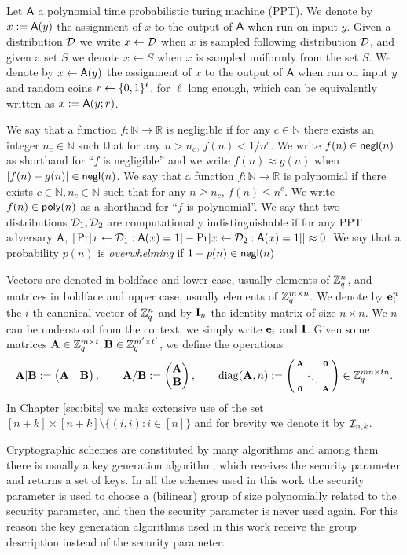 Let $\mathsf{A}$ a polynomial time probabilistic turing machine (PPT). We denote by $x:=\mathsf{A}(y)$ the assignment of $x$ to the output of $\mathsf{A}$ when run on input $y$. Given a distribution $\mathcal{D}$ we write $x\gets\mathcal{D}$ when $x$ is sampled following distribution $\mathcal{D}$, and given a set $S$ we denote $x\gets S$ when $x$ is sampled uniformly from the set $S$. We denote by $x\gets\mathsf{A}(y)$ the assignment of $x$ to the output of $\mathsf{A}$ when run on input $y$ and random coins $r\gets\{0,1\}^\ell$, for $\ell$ long enough, which can be equivalently written as $x:=\mathsf{A}(y;r)$. 

We say that a function $f:\mathbb{N}\to\mathbb{R}$ is negligible if for any $c\in\mathbb{N}$ there exists an integer $n_c\in\mathbb{N}$ such that for any $n> n_c$, $f(n)<1/n^c$. We write $f(n)\in\mathsf{negl}(n)$ as shorthand for ``$f$ is negligible'' and we write $f(n)\approx g(n)$ when $|f(n)-g(n)|\in\mathsf{negl}(n)$. We say that a function $f:\mathbb{N}\to\mathbb{R}$ is polynomial if there exists $c\in\mathbb{N},n_c\in\mathbb{N}$ such that for any $n\geq n_c$, $f(n)\leq n^c$. We write $f(n)\in\mathsf{poly}(n)$ as a shorthand for ``$f$ is polynomial''.
We say that two distributions $\mathcal{D}_1,\mathcal{D}_2$ are computationally indistinguishable if for any PPT adversary $\mathsf{A}$, $|\Pr[x\gets\mathcal{D}_1: \mathsf{A}(x)=1]-\Pr[x\gets\mathcal{D}_2: \mathsf{A}(x)=1]|\approx 0$. We say that a probability $p(n)$ is \emph{overwhelming} if $1-p(n)\in\mathsf{negl}(n)$

Vectors are denoted in boldface and lower case, usually elements of $\mathbb{Z}_q^n$, and matrices in boldface and upper case, usually elements of $\mathbb{Z}_q^{m\times n}$. We denote by $\mathbf{e}_i^n$ the $i$ th canonical vector of $\mathbb{Z}_q^n$ and by $\mathbf{{I}}_{n}$ the identity matrix of size $n\times n$. We $n$ can be understood from the context, we simply write $\mathbf{e}_i$ and $\mathbf{{I}}$. Given some matrices $\mathbf{{A}}\in\mathbb{Z}_q^{m\times t},\mathbf{{B}}\in\mathbb{Z}_q^{m'\times t'}$, we define the operations
 $$\mathbf{{A}}|\mathbf{{B}} := \left(\begin{matrix}\mathbf{{A}}&\mathbf{{B}}\end{matrix}\right), \qquad \mathbf{A}/ \mathbf{B}:=\left(\begin{matrix} \mathbf{A} \\ \mathbf{{B}}\end{matrix}\right), \qquad 
\mathrm{diag}(\mathbf{{A}},n):=\left(\begin{smallmatrix} \mathbf{{A}} &  & \mathbf{{0}} \\   & \ddots &   \\ \mathbf{{0}} &  & \mathbf{{A}}
\end{smallmatrix}\right)\in\mathbb{Z}_q^{mn\times tn}.$$
In Chapter \ref{sec:bits} we make extensive use of the set $[n+k]\times[n+k]\setminus\{(i,i):i\in[n]\}$ and for brevity we denote it by $\mathcal{I}_{n,k}$.

Cryptographic schemes are constituted by many algorithms and among them there is usually a key generation algorithm, which receives the security parameter and returns a set of keys. In all the schemes used in this work the security parameter is used to choose a (bilinear) group of size polynomially related to the security parameter, and then the security parameter is never used again. For this reason the key generation algorithms used in this work receive the group description instead of the security parameter.
